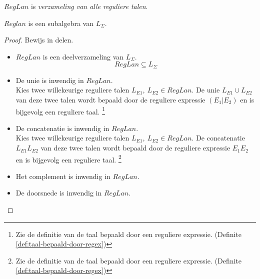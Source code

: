 \documentclass[main.tex]{subfiles}
\begin{document}
\begin{de}
  $RegLan$ is \emph{verzameling van alle reguliere talen}.
\end{de}

\begin{ei}
  $Reglan$ is een subalgebra van $L_{\Sigma}$.

  \begin{proof}
    Bewijs in delen.
    \begin{itemize}
    \item $RegLan$ is een deelverzameling van $L_{\Sigma}$.
      \[ RegLan \subseteq L_{\Sigma} \]
    \item De unie is inwendig in $RegLan$.\\
      Kies twee willekeurige reguliere talen $L_{E1},\ L_{E2} \in RegLan$.
      De unie $L_{E1} \cup L_{E2}$ van deze twee talen wordt bepaald door de reguliere expressie $(E_1|E_2)$ en is bijgevolg een reguliere taal.
      \footnote{Zie de definitie van de taal bepaald door een reguliere expressie. (Definite \ref{def:taal-bepaald-door-regex})}
    \item De concatenatie is inwendig in $RegLan$.\\
      Kies twee willekeurige reguliere talen $L_{E1},\ L_{E2} \in RegLan$.
      De concatenatie $L_{E1}L_{E2}$ van deze twee talen wordt bepaald door de reguliere expressie $E_1E_2$ en is bijgevolg een reguliere taal.
      \footnote{Zie de definitie van de taal bepaald door een reguliere expressie. (Definite \ref{def:taal-bepaald-door-regex})}
    \item Het complement is inwendig in $RegLan$.
    \item De doorsnede is inwendig in $RegLan$.
    \end{itemize}
  \end{proof}
\end{ei}
\end{document}

